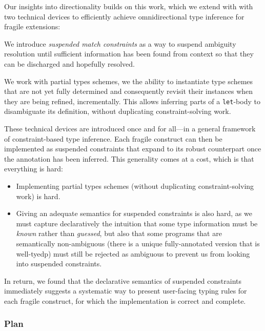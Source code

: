 \documentclass[acmsmall,screen,nonacm]{acmart}
\begin{document}
Our insights into directionality builds on this work, which we extend with
with two technical devices to efficiently achieve omnidirectional type
inference for fragile \ML extensions:
\begin{enumerate*}
\item
  We introduce \emph{suspended match constraints} as a way to suspend
  ambiguity resolution until sufficient information has been found from
  context so that they can be discharged and hopefully resolved.
\item
  We work with partial types schemes, \ie we the ability to instantiate type
  schemes that are not yet fully determined and consequently revisit their
  instances when they are being refined, incrementally. This allows
  inferring parts of a \texttt{let}-body to disambiguate its definition,
  without duplicating constraint-solving work.
\end{enumerate*}

These technical devices are introduced once and for all---in a general
framework of constraint-based type inference. Each fragile \ML construct can
then be implemented as suspended constraints that expand to its robust
counterpart once the annotation has been inferred. This generality comes at
a cost, which is that everything is hard:
\begin{itemize}
\item Implementing partial types schemes (without duplicating
  constraint-solving work) is hard.
\item Giving an adequate semantics for suspended constraints is also hard, as we
  must capture declaratively the intuition that some type information must be
  \emph{known} rather than \emph{guessed}, but also that some programs
  that are semantically non-ambiguous (there is a unique fully-annotated
  version that is well-tyedp) must still be rejected as ambiguous to prevent
  us from looking into suspended constraints.
\end{itemize}
In return, we found that the declarative semantics of suspended constraints
immediately suggests a systematic way to present user-facing typing rules
for each fragile construct, for which the implementation is correct and
complete.

\subsubsection* {Plan}
\end{document}

